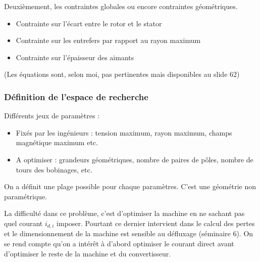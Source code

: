 Deuxièmement, les contraintes globales ou encore contraintes géométriques.
\begin{itemize}
    \item Contrainte sur l'écart entre le rotor et le stator
    \item Contrainte sur les entrefers par rapport au rayon maximum
    \item Contrainte sur l'épaisseur des aimants
\end{itemize}
(Les équations sont, selon moi, pas pertinentes mais disponibles au slide 62)

\subsubsection{Définition de l'espace de recherche}
Différents jeux de paramètres :
\begin{itemize}
    \item Fixés par les ingénieurs : tension maximum, rayon maximum, champs magnétique maximum etc. 
    \item A optimiser : grandeurs géométriques, nombre de paires de pôles, nombre de tours des bobinages, etc. 
\end{itemize}
On a définit une plage possible pour chaque paramètres. C'est une géométrie non paramétrique. 

La difficulté dans ce problème, c'est d'optimiser la machine en ne sachant pas quel courant $i_{d,i}$ imposer. Pourtant ce dernier intervient dans le calcul des pertes et le dimensionnement de la machine est sensible au défluxage (séminaire 6). On se rend compte qu'on a intérêt à d'abord optimiser le courant direct avant d'optimiser le reste de la machine et du convertisseur.

